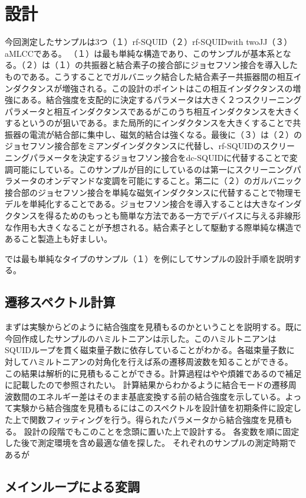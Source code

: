 \section{設計}
        今回測定したサンプルは3つ（１）rf-SQUID（２）rf-SQUIDwith twoJJ（３）aMLCCである。
        （１）は最も単純な構造であり、このサンプルが基本系となる。（２）は（１）の共振器と結合素子の接合部にジョセフソン接合を導入したものである。こうすることでガルバニック結合した結合素子ー共振器間の相互インダクタンスが増強される。この設計のポイントはこの相互インダクタンスの増強にある。結合強度を支配的に決定するパラメータは大きく２つスクリーニングパラメータと相互インダクタンスであるがこのうち相互インダクタンスを大きくするというのが狙いである。また局所的にインダクタンスを大きくすることで共振器の電流が結合部に集中し、磁気的結合は強くなる。最後に（３）は（２）のジョセフソン接合部をミアンダインダクタンスに代替し、rf-SQUIDのスクリーニングパラメータを決定するジョセフソン接合をdc-SQUIDに代替することで変調可能にしている。このサンプルが目的にしているのは第一にスクリーニングパラメータのオンデマンドな変調を可能にすること。第二に（２）のガルバニック接合部のジョセフソン接合を単純な磁気インダクタンスに代替することで物理モデルを単純化することである。ジョセフソン接合を導入することは大きなインダクタンスを得るためのもっとも簡単な方法である一方でデバイスに与える非線形な作用も大きくなることが予想される。結合素子として駆動する際単純な構造であること製造上も好ましい。

        では最も単純なタイプのサンプル（１）を例にしてサンプルの設計手順を説明する。
    \subsection{遷移スペクトル計算}
        まずは実験からどのように結合強度を見積もるのかということを説明する。既に今回作成したサンプルのハミルトニアンは示した。このハミルトニアンはSQUIDループを貫く磁束量子数に依存していることがわかる。各磁束量子数に対してハミルトニアンの対角化を行えば系の遷移周波数を知ることができる。
        この結果は解析的に見積もることができる。計算過程はやや煩雑であるので補足に記載したので参照されたい。
        計算結果からわかるように結合モードの遷移周波数間のエネルギー差はそのまま基底変換する前の結合強度を示している。よって実験から結合強度を見積もるにはこのスペクトルを設計値を初期条件に設定した上で関数フィッティングを行う。得られたパラメータから結合強度を見積もる。
        設計の段階でもこのことを念頭に置いた上で設計する。
        各変数を順に固定した後で測定環境を含め最適な値を探した。
        それぞれのサンプルの測定時期であるが
    \subsection{メインループによる変調}
